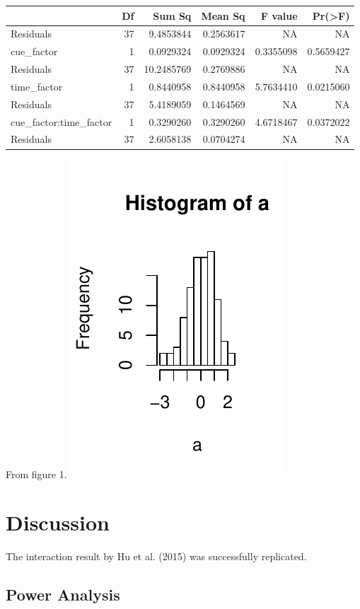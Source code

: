 \documentclass[man,floatsintext]{apa6}
\begin{document}
\begin{tabular}{l|r|r|r|r|r}
\hline
  & Df & Sum Sq & Mean Sq & F value & Pr(>F)\\
\hline
Residuals & 37 & 9.4853844 & 0.2563617 & NA & NA\\
\hline
cue\_factor & 1 & 0.0929324 & 0.0929324 & 0.3355098 & 0.5659427\\
\hline
Residuals & 37 & 10.2485769 & 0.2769886 & NA & NA\\
\hline
time\_factor & 1 & 0.8440958 & 0.8440958 & 5.7634410 & 0.0215060\\
\hline
Residuals & 37 & 5.4189059 & 0.1464569 & NA & NA\\
\hline
cue\_factor:time\_factor & 1 & 0.3290260 & 0.3290260 & 4.6718467 & 0.0372022\\
\hline
Residuals & 37 & 2.6058138 & 0.0704274 & NA & NA\\
\hline
\end{tabular}

From figure 1. \includegraphics{first_apa_files/figure-latex/fig1-1.pdf}

\section{Discussion}\label{discussion}

The interaction result by Hu et al. (2015) was successfully replicated.

\subsection{Power Analysis}\label{power-analysis}
\end{document}
